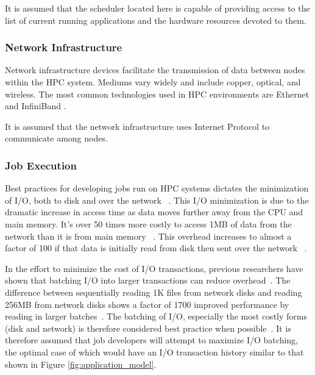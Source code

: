 \documentclass[oneside,12pt]{memoir}
\begin{document}
It is assumed that the scheduler located here is capable of providing access to the list of current running applications and the hardware resources devoted to them. 
\subsubsection{Network Infrastructure}
Network infrastructure devices facilitate the transmission of data between nodes within the HPC system. Mediums vary widely and include copper, optical, and wireless. The most common technologies used in HPC environments are Ethernet and InfiniBand \cite{bozzo2006design}\cite{madai2010performance}. 

It is assumed that the network infrastructure uses Internet Protocol to communicate among nodes.

\subsubsection{Job Execution}
Best practices for developing jobs run on HPC systems dictates the minimization of I/O, both to disk and over the network ~\cite{shan2007using}. This I/O minimization is due to the dramatic increase in access time as data moves further away from the CPU and main memory. It's over 50 times more costly to access 1MB of data from the network than it is from main memory ~\cite{dean2009designs}. This overhead increases to almost a factor of 100 if that data is initially read from disk then sent over the network ~\cite{dean2009designs}.

In the effort to minimize the cost of I/O transactions, previous researchers have shown that batching I/O into larger transactions can reduce overhead~\cite{shan2008characterizing}. The difference between sequentially reading 1K files from network disks and reading 256MB from network disks shows a factor of 1700 improved performance by reading in larger batches~\cite{shan2007using}. The batching of I/O, especially the most costly forms (disk and network) is therefore considered best practice when possible~\cite{borrill2007investigation}. It is therefore assumed that job developers will attempt to maximize I/O batching, the optimal case of which would have an I/O transaction history similar to that shown in Figure \ref{fig:application_model}.
\end{document}
